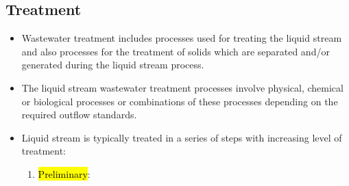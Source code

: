 \subsection{Treatment}

\begin{itemize}
\item Wastewater treatment includes processes  used for treating the liquid stream and also processes for the treatment of solids which are separated and/or generated during the liquid stream process.
\item The liquid stream wastewater treatment processes involve physical, chemical or biological processes or combinations of these processes depending on the required outflow standards. 
\item Liquid stream is typically treated in a series of steps with increasing level of treatment:
\begin{enumerate}
\item \hl{Preliminary}:  
			

\end{enumerate}
\end{itemize}
